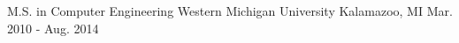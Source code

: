 

\begin{cventries}

  \cventry
    {M.S. in Computer Engineering} %
    {Western Michigan University} %
    {Kalamazoo, MI} %
    {Mar. 2010 - Aug. 2014} %

\end{cventries}
